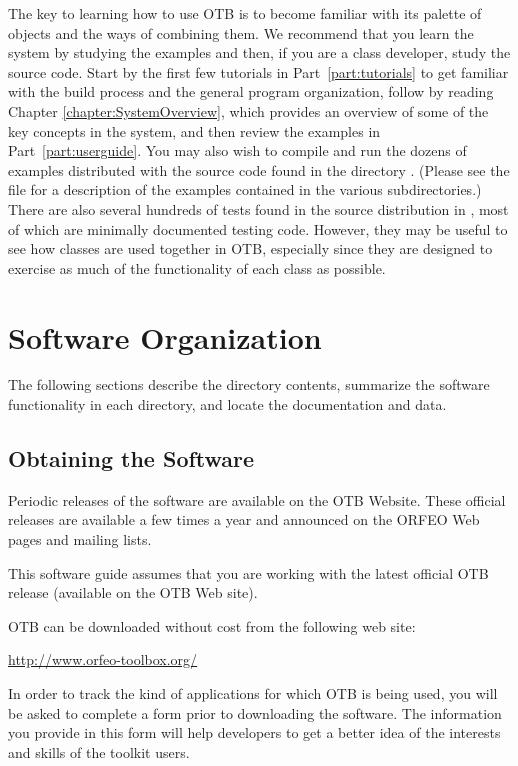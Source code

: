The key to learning how to use OTB is to become familiar with its
palette of objects and the ways of combining them. We recommend that you learn
the system by studying the
examples and then, if you are a class developer, study the source
code. Start by the first few tutorials in Part~\ref{part:tutorials} to get
familiar with the build process and the general program organization, follow by
reading Chapter \ref{chapter:SystemOverview}, which provides an overview of some
of the key concepts in the system, and then review the examples in
Part~\ref{part:userguide}. You may also wish to compile and run the dozens of
examples
distributed with the source code found in the directory
. (Please see the file
 for a description of the examples
contained in the various subdirectories.) There are also several
hundreds of tests found in the source distribution in
, most of which are minimally documented
testing code. However, they may be useful to see how classes are used
together in OTB, especially since they are designed to exercise as
much of the functionality of each class as possible.

\section{Software Organization}
\label{sec:SoftwareOrganization}

The following sections describe the directory contents, summarize the
software functionality in each directory, and locate the documentation and
data.

\subsection{Obtaining the Software}
\label{sec:ObtainingTheSoftware}

Periodic releases of the software are available on the OTB Website. These
official releases are available a few times a year and announced on the ORFEO
Web pages and mailing lists.

This software guide assumes that you are working with the latest official OTB
release (available on the OTB Web site). %


OTB can be downloaded without cost from the following web site:
\begin{center}
  \url{http://www.orfeo-toolbox.org/}
\end{center}
In order to track the kind of applications for which OTB is being used, you
will be asked to complete a form prior to downloading the software.
The information you provide in this form will help developers to get a better
idea of the interests and skills of the toolkit users.

